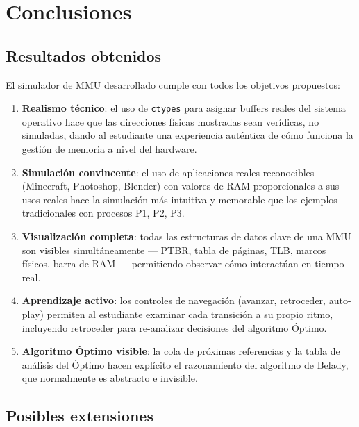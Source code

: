 \documentclass[12pt,a4paper]{article}
\begin{document}
\newpage

\section{Conclusiones}

\subsection{Resultados obtenidos}

El simulador de MMU desarrollado cumple con todos los objetivos propuestos:

\begin{enumerate}[leftmargin=1.5cm]
  \item \textbf{Realismo técnico}: el uso de \texttt{ctypes} para asignar buffers reales
        del sistema operativo hace que las direcciones físicas mostradas sean verídicas,
        no simuladas, dando al estudiante una experiencia auténtica de cómo funciona
        la gestión de memoria a nivel del hardware.

  \item \textbf{Simulación convincente}: el uso de aplicaciones reales reconocibles
        (Minecraft, Photoshop, Blender) con valores de RAM proporcionales a sus usos
        reales hace la simulación más intuitiva y memorable que los ejemplos tradicionales
        con procesos P1, P2, P3.

  \item \textbf{Visualización completa}: todas las estructuras de datos clave de una MMU
        son visibles simultáneamente — PTBR, tabla de páginas, TLB, marcos físicos, barra
        de RAM — permitiendo observar cómo interactúan en tiempo real.

  \item \textbf{Aprendizaje activo}: los controles de navegación (avanzar, retroceder,
        auto-play) permiten al estudiante examinar cada transición a su propio ritmo,
        incluyendo retroceder para re-analizar decisiones del algoritmo Óptimo.

  \item \textbf{Algoritmo Óptimo visible}: la cola de próximas referencias y la tabla
        de análisis del Óptimo hacen explícito el razonamiento del algoritmo de Belady,
        que normalmente es abstracto e invisible.
\end{enumerate}

\subsection{Posibles extensiones}
\end{document}
